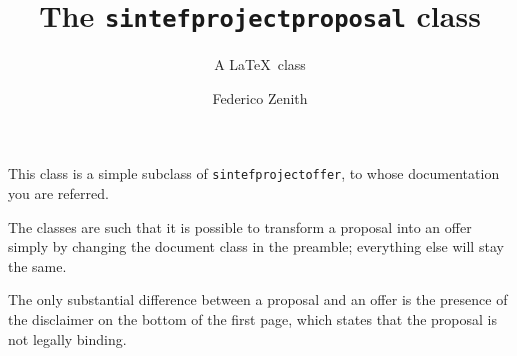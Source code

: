 \documentclass[unrestricted]{sintefprojectproposal}
\title{The \texttt{sintefprojectproposal} class}
\subtitle{A \LaTeX\ class}
\author{Federico Zenith}
\begin{document}
\frontmatter
This class is a simple subclass of \texttt{sintefprojectoffer}, to whose
documentation you are referred.

The classes are such that it is possible to transform a proposal into an
offer simply by changing the document class in the preamble; everything
else will stay the same.

The only substantial difference between a proposal and an offer is the
presence of the disclaimer on the bottom of the first page, which states
that the proposal is not legally binding.
\end{document}
